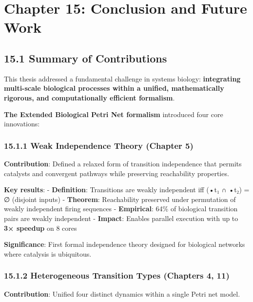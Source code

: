 \hypertarget{chapter-15-conclusion-and-future-work}{%
\chapter{Chapter 15: Conclusion and Future
Work}\label{chapter-15-conclusion-and-future-work}}

\hypertarget{summary-of-contributions}{%
\section{15.1 Summary of Contributions}\label{summary-of-contributions}}

This thesis addressed a fundamental challenge in systems biology:
\textbf{integrating multi-scale biological processes within a unified,
mathematically rigorous, and computationally efficient formalism}.

\textbf{The Extended Biological Petri Net formalism} introduced four
core innovations:

\hypertarget{weak-independence-theory-chapter-5}{%
\subsection{15.1.1 Weak Independence Theory (Chapter
5)}\label{weak-independence-theory-chapter-5}}

\textbf{Contribution}: Defined a relaxed form of transition independence
that permits catalysts and convergent pathways while preserving
reachability properties.

\textbf{Key results}: - \textbf{Definition}: Transitions are weakly
independent iff (•t₁ ∩ •t₂) = ∅ (disjoint inputs) - \textbf{Theorem}:
Reachability preserved under permutation of weakly independent firing
sequences - \textbf{Empirical}: 64\% of biological transition pairs are
weakly independent - \textbf{Impact}: Enables parallel execution with up
to \textbf{3× speedup} on 8 cores

\textbf{Significance}: First formal independence theory designed for
biological networks where catalysis is ubiquitous.

\hypertarget{heterogeneous-transition-types-chapters-4-11}{%
\subsection{15.1.2 Heterogeneous Transition Types (Chapters 4,
11)}\label{heterogeneous-transition-types-chapters-4-11}}

\textbf{Contribution}: Unified four distinct dynamics within a single
Petri net model.

